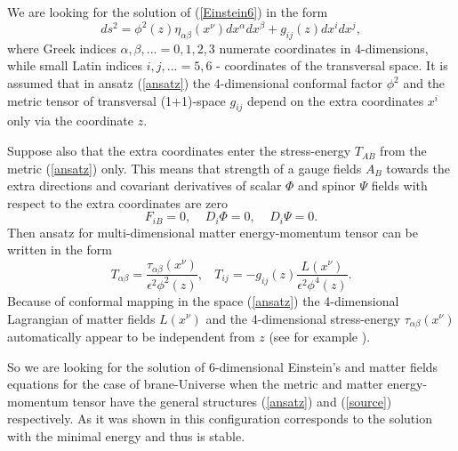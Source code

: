 \documentclass[a4paper,a4paper]{article}
\begin{document}
We are looking for the solution of (\ref{Einstein6}) in the form
\begin{equation} \label{ansatz}
ds^2= \phi ^2(z) \eta_{\alpha \beta }(x^\nu)dx^\alpha dx^\beta +
g_{ij}(z)dx^i dx^j ,
\end{equation}
where Greek indices $\alpha, \beta,... = 0, 1, 2, 3$ numerate
coordinates in 4-dimensions, while small Latin indices
$i, j, ... = 5, 6$ - coordinates of the transversal space. It is
assumed that in ansatz (\ref{ansatz}) the 4-dimensional conformal
factor $\phi^2$ and the metric tensor of transversal (1+1)-space
$g_{ij}$ depend on the extra coordinates $x^i$ only via the
coordinate $z$.

Suppose also that the extra coordinates enter the stress-energy
$T_{AB}$ from the metric (\ref{ansatz}) only. This means that
strength of a gauge fields $A_B$ towards the extra directions
and covariant derivatives of scalar $\Phi$ and spinor $\Psi$ 
fields with respect to the extra coordinates are zero \cite{G3}
\begin{equation} \label{extra}
F_{iB} = 0 , ~~~~~D_i\Phi = 0 , ~~~~~D_i\Psi = 0.
\end{equation}
Then ansatz for multi-dimensional matter energy-momentum tensor can
be written in the form
\begin{equation} \label{source}
T_{\alpha\beta } = \frac{\tau_{\alpha\beta }(x^\nu)}{\epsilon^2
\phi ^2(z)}, ~~~~ T_{ij} = - g_{ij}(z)\frac{L(x^\nu)}{\epsilon^2
\phi ^4(z)} .
\end{equation}
Because of conformal mapping in the space (\ref{ansatz}) the
4-dimensional Lagrangian of matter fields $L(x^\nu)$ and the
4-dimensional stress-energy $\tau_{\alpha \beta}(x^\nu )$
automatically appear to be independent from $z$ (see for example
\cite{PeRi}).

So we are looking for the solution of 6-dimensional Einstein's and
matter fields equations for the case of brane-Universe when the
metric and matter energy-momentum tensor have the general structures
(\ref{ansatz}) and (\ref{source}) respectively. As it was shown in
\cite{G3} this configuration corresponds to the solution with the
minimal energy and thus is stable.
\end{document}
